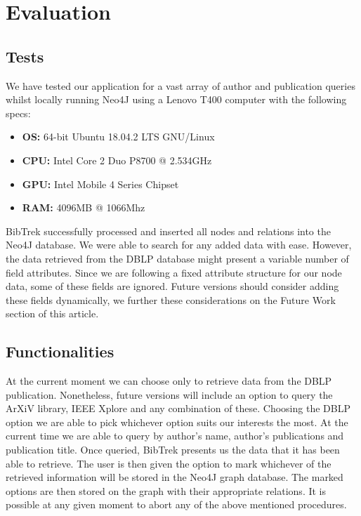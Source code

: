 \documentclass[twocolumn]{article}
\begin{document}
\section{Evaluation}
\subsection{Tests}
We have tested our application for a vast array of author and publication queries whilst locally running Neo4J using a Lenovo T400 computer with the following specs:
\begin{itemize}
\item \textbf{OS:} 64-bit Ubuntu 18.04.2 LTS GNU/Linux 
\item \textbf{CPU:} Intel Core 2 Duo P8700 @ 2.534GHz 
\item \textbf{GPU:} Intel Mobile 4 Series Chipset
\item \textbf{RAM:} 4096MB @ 1066Mhz 
\end{itemize}
BibTrek successfully processed and inserted all nodes and relations into the Neo4J database. We were able to search for any added data with ease. However, the data retrieved from the DBLP database might present a variable number of field attributes. Since we are following a fixed attribute structure for our node data, some of these fields are ignored. Future versions should consider adding these fields dynamically, we further these considerations on the Future Work section of this article.
\subsection{Functionalities}
At the current moment we can choose only to retrieve data from the DBLP publication. Nonetheless, future versions will include an option to query the ArXiV library, IEEE Xplore and any combination of these. Choosing the DBLP option we are able to pick whichever option suits our interests the most. At the current time we are able to query by author's name, author's publications and publication title. Once queried, BibTrek presents us the data that it has been able to retrieve. The user is then given the option to mark whichever of the retrieved information will be stored in the Neo4J graph database. The marked options are then stored on the graph with their appropriate relations. It is possible at any given moment to abort any of the above mentioned procedures.
\end{document}
